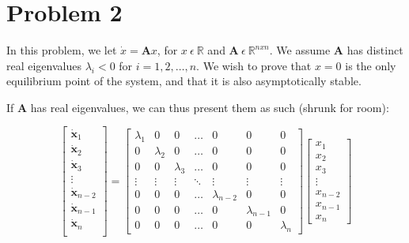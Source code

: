 \documentclass{article}
\begin{document}
\section*{Problem 2}
In this problem, we let $\dot{x}=\boldsymbol{A}x$, for $x \ \epsilon \ \mathbb{R}$ and $\boldsymbol{A} \ \epsilon \ \mathbb{R}^{nxn}$. We assume $\boldsymbol{A}$ has distinct real eigenvalues $\lambda_i < 0$ for $i = 1,2,\dots,n$. We wish to prove that $x = 0$ is the only equilibrium point of the system, and that it is also asymptotically stable.

If $\boldsymbol{A}$ has real eigenvalues, we can thus present them as such (shrunk for room):

\begin{equation}
    \begin{bmatrix}
        \dot{\boldsymbol{x}}_1 \\
        \dot{\boldsymbol{x}}_2 \\
        \dot{\boldsymbol{x}}_3 \\
        \vdots \\
        \dot{\boldsymbol{x}}_{n-2} \\
        \dot{\boldsymbol{x}}_{n-1} \\
        \dot{\boldsymbol{x}}_{n} \\
    \end{bmatrix}
    =
    \begin{bmatrix}
        \lambda_1 & 0 & 0 & \dots & 0 & 0 & 0 \\
        0 & \lambda_2 & 0 & \dots & 0 & 0 & 0 \\
        0 & 0 & \lambda_3 & \dots & 0 & 0 & 0 \\
        \vdots & \vdots & \vdots & \ddots & \vdots & \vdots & \vdots \\
        0 & 0 & 0 & \dots & \lambda_{n-2} & 0 & 0 \\ 
        0 & 0 & 0 & \dots & 0 & \lambda_{n-1} & 0 \\
        0 & 0 & 0 & \dots & 0 & 0 & \lambda_n
    \end{bmatrix}
    \begin{bmatrix}
        x_1 \\
        x_2 \\
        x_3 \\
        \vdots \\
        x_{n-2} \\
        x_{n-1} \\
        x_n
    \end{bmatrix}
\end{equation}
\end{document}

